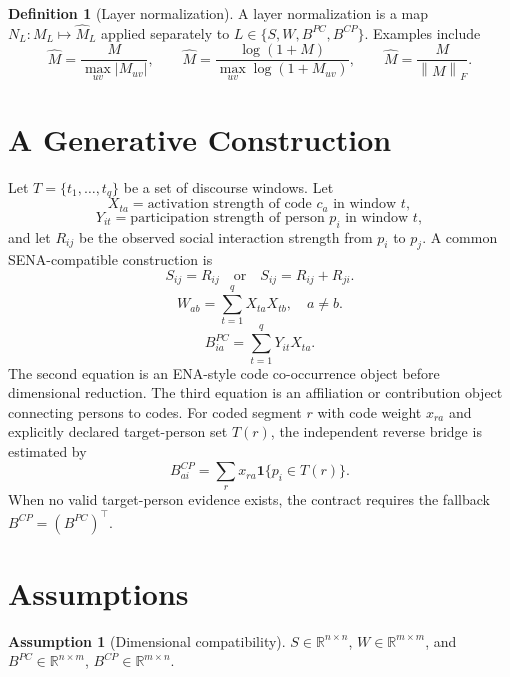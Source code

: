 \documentclass[11pt]{article}
\theoremstyle{definition}
\newtheorem{definition}{Definition}
\newtheorem{assumption}{Assumption}
\newcommand{\R}{\mathbb{R}}
\newcommand{\Smat}{S}
\newcommand{\Wmat}{W}
\newcommand{\norm}[1]{\left\lVert #1 \right\rVert}
\begin{document}
\begin{definition}[Layer normalization]
A layer normalization is a map \(N_L:M_L\mapsto \widehat M_L\) applied
separately to \(L\in\{S,W,B^{PC},B^{CP}\}\). Examples include
\[
\widehat M=\frac{M}{\max_{uv}|M_{uv}|},\qquad
\widehat M=\frac{\log(1+M)}{\max_{uv}\log(1+M_{uv})},\qquad
\widehat M=\frac{M}{\norm{M}_F}.
\]
\end{definition}

\section{A Generative Construction}

Let \(T=\{t_1,\ldots,t_q\}\) be a set of discourse windows. Let
\[
X_{ta}=\text{activation strength of code }c_a\text{ in window }t,
\]
\[
Y_{it}=\text{participation strength of person }p_i\text{ in window }t,
\]
and let \(R_{ij}\) be the observed social interaction strength from \(p_i\) to
\(p_j\). A common SENA-compatible construction is
\begin{equation}
S_{ij}=R_{ij} \quad\text{or}\quad S_{ij}=R_{ij}+R_{ji}.
\end{equation}
\begin{equation}
W_{ab}=\sum_{t=1}^q X_{ta}X_{tb}, \quad a\ne b.
\end{equation}
\begin{equation}
B^{PC}_{ia}=\sum_{t=1}^q Y_{it}X_{ta}.
\end{equation}
The second equation is an ENA-style code co-occurrence object before
dimensional reduction. The third equation is an affiliation or contribution
object connecting persons to codes. For coded segment \(r\) with code weight
\(x_{ra}\) and explicitly declared target-person set \(T(r)\), the independent
reverse bridge is estimated by
\begin{equation}
B^{CP}_{ai}=\sum_r x_{ra}\mathbf 1\{p_i\in T(r)\}.
\end{equation}
When no valid target-person evidence exists, the contract requires the fallback
\(B^{CP}=(B^{PC})^\top\).

\section{Assumptions}

\begin{assumption}[Dimensional compatibility]
\(\Smat\in\R^{n\times n}\), \(\Wmat\in\R^{m\times m}\), and
\(B^{PC}\in\R^{n\times m}\), \(B^{CP}\in\R^{m\times n}\).
\end{assumption}
\end{document}
